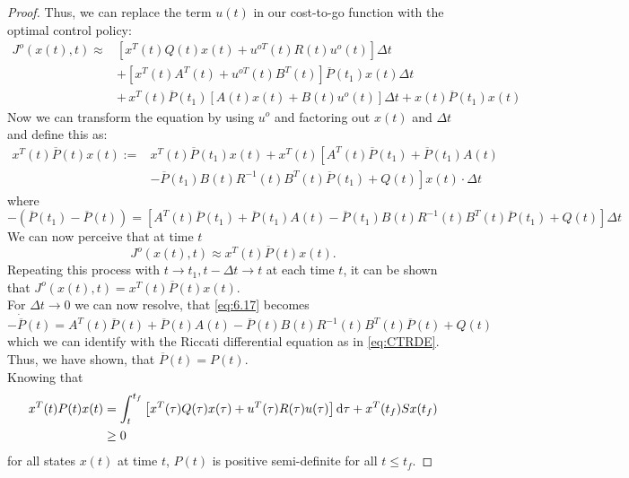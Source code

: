\documentclass[paper=a4, pagesize, DIV=calc, BCOR=12.5mm, twoside=on, onecolumn=on, open = any, titlepage =on, parskip =half-, headsepline = on, footsepline = on, chapterprefix = on, appendixprefix = off, fontsize = 12pt, numbers = noenddot, abstract = on]{scrbook}
\numberwithin{equation}{chapter}
\theoremstyle{definition}
\theoremstyle{plain}
\theoremstyle{plain}
\theoremstyle{remark}
\theoremstyle{plain}
\theoremstyle{plain}
\begin{document}
\begin{proof}
Thus, we can replace the term $u(t)$ in our cost-to-go function with the optimal control policy: 
\begin{align*}
J^o(x(t), t) \approx & \left[ x^T(t)Q(t)x(t) + u^{oT}(t)R(t)u^o(t) \right] \Delta t\\
& +\left[ x^T(t)A^T(t) + u^{oT}(t)B^T(t) \right] \overline{P}(t_1)x(t)\Delta t\\
 & +\, x^T(t)\overline{P}(t_1)\left[ A(t)x(t) + B(t)u^o(t) \right] \Delta t + x(t)\overline{P}(t_1)x(t)
 \end{align*}
 Now we can transform the equation by using $u^o$ and factoring out $x(t)$ and $\Delta t$ and define this as:
 \begin{align*}
 x^T(t)\overline{P}(t)x(t) :=  & x^T(t)\overline{P}(t_1)x(t) + x^T(t) \left[ A^T(t)\overline{P}(t_1) + \overline{P}(t_1)A(t) \right.\\
 & \left. - \overline{P}(t_1)B(t)R^{-1}(t)B^T(t)\overline{P}(t_1)+Q(t)\right] x(t) \cdot \Delta t
 \end{align*}
 where 
 \begin{equation}
-\left(\overline{P}(t_1) - \overline{P}(t)\right) =  \left[ A^T(t)\overline{P}(t_1) + \overline{P}(t_1)A(t)- \overline{P}(t_1)B(t)R^{-1}(t)B^T(t)\overline{P}(t_1)+Q(t)\right] \Delta t  \label{eq:6.17}
 \end{equation}
 We can now perceive that at time $t$
 \[
J^o(x(t),t) \approx x^T(t)\overline{P}(t)x(t). 
 \]
 Repeating this process with $t \rightarrow t_1, t - \Delta t \rightarrow t$ at each time $t$, it can be shown that $J^o(x(t),t) = x^T(t)\overline{P}(t)x(t)$.\\
 For $\Delta t \rightarrow 0$ we can now resolve, that \eqref{eq:6.17} becomes
 \[
-\dot{\overline{P}}(t) =  A^T(t)\overline{P}(t) + \overline{P}(t)A(t)- \overline{P}(t)B(t)R^{-1}(t)B^T(t)\overline{P}(t)+Q(t)
 \]
 which we can identify with the Riccati differential equation as in \eqref{eq:CTRDE}. Thus, we have shown, that $\overline{P}(t) = P(t)$.\\
 Knowing that 
 \begin{align*}
x^T(t)P(t)x(t) &=  \int_t^{t_f} \left[ x^T(\tau)Q(\tau)x(\tau) + u^T(\tau)R(\tau)u(\tau)\right] \mathop{}\!\mathrm{d}\tau + x^T(t_f)Sx(t_f)\\
 & \geq 0
 \end{align*}
 for all states $x(t)$ at time $t$, $P(t)$ is positive semi-definite for all $t \le t_f$.
\end{proof}
\newpage
\par \singlespacing
\end{document}
